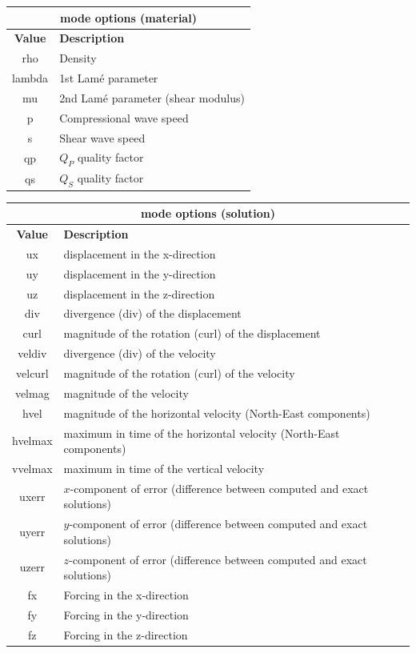 \documentclass[11pt]{report}
\begin{document}
\begin{center}
\begin{tabular}{|c|l|} \hline
\multicolumn{2}{|c|}{\bf mode options (material)}\\ \hline
\bf{Value} & \bf{Description} \\ 
\hline  \hline
rho     & Density \\ \hline
lambda  & 1st Lam\'e parameter \\ \hline
mu      & 2nd Lam\'e parameter (shear modulus) \\ \hline
p       & Compressional wave speed \\ \hline
s       & Shear wave speed \\ \hline
qp      & $Q_P$ quality factor \\ \hline
qs      & $Q_S$ quality factor \\ \hline
\end{tabular}
\end{center}
\begin{center}
\begin{tabular}{|c|l|} \hline
\multicolumn{2}{|c|}{\bf mode options (solution)}\\ \hline
\bf{Value} & \bf{Description} \\ 
\hline  \hline
ux      & displacement in the x-direction \\ \hline
uy      & displacement in the y-direction \\ \hline
uz      & displacement in the z-direction \\ \hline
div     & divergence (div) of the displacement \\ \hline
curl    & magnitude of the rotation (curl) of the displacement \\ \hline 
veldiv  & divergence (div) of the velocity \\ \hline
velcurl & magnitude of the rotation (curl) of the velocity \\ \hline
velmag  & magnitude of the velocity \\ \hline
hvel    & magnitude of the horizontal velocity (North-East components) \\ \hline
hvelmax & maximum in time of the horizontal velocity (North-East components) \\ \hline
vvelmax & maximum in time of the vertical velocity \\ \hline
uxerr   & $x$-component of error (difference between computed and exact solutions)\\ \hline
uyerr   & $y$-component of error (difference between computed and exact solutions)\\ \hline
uzerr   & $z$-component of error (difference between computed and exact solutions)\\ \hline
fx      & Forcing in the x-direction\\ \hline
fy      & Forcing in the y-direction\\ \hline
fz      & Forcing in the z-direction\\ \hline
\end{tabular}
\end{center}
\end{document}

